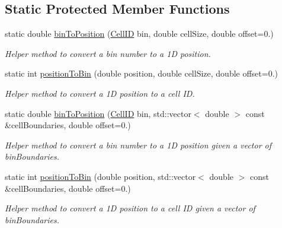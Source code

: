 \subsection*{Static Protected Member Functions}
\begin{DoxyCompactItemize}
\item 
static double \hyperlink{class_d_d4hep_1_1_d_d_segmentation_1_1_segmentation_a550acc9cdf597965091b4d76ce1578cb}{binToPosition} (\hyperlink{namespace_d_d4hep_1_1_d_d_segmentation_ac7af071d85cb48820914434a07e21ba1}{CellID} bin, double cellSize, double offset=0.)
\begin{DoxyCompactList}\small\item\em Helper method to convert a bin number to a 1D position. \item\end{DoxyCompactList}\item 
static int \hyperlink{class_d_d4hep_1_1_d_d_segmentation_1_1_segmentation_ac4b0fad36827310fd144843d77e39d71}{positionToBin} (double position, double cellSize, double offset=0.)
\begin{DoxyCompactList}\small\item\em Helper method to convert a 1D position to a cell ID. \item\end{DoxyCompactList}\item 
static double \hyperlink{class_d_d4hep_1_1_d_d_segmentation_1_1_segmentation_aeb5bfa97c90cefa129ad0c5d2dcb94fc}{binToPosition} (\hyperlink{namespace_d_d4hep_1_1_d_d_segmentation_ac7af071d85cb48820914434a07e21ba1}{CellID} bin, std::vector$<$ double $>$ const \&cellBoundaries, double offset=0.)
\begin{DoxyCompactList}\small\item\em Helper method to convert a bin number to a 1D position given a vector of binBoundaries. \item\end{DoxyCompactList}\item 
static int \hyperlink{class_d_d4hep_1_1_d_d_segmentation_1_1_segmentation_a9357e76769306a1bf6f92c8a5d8eb6b4}{positionToBin} (double position, std::vector$<$ double $>$ const \&cellBoundaries, double offset=0.)
\begin{DoxyCompactList}\small\item\em Helper method to convert a 1D position to a cell ID given a vector of binBoundaries. \item\end{DoxyCompactList}\end{DoxyCompactItemize}
